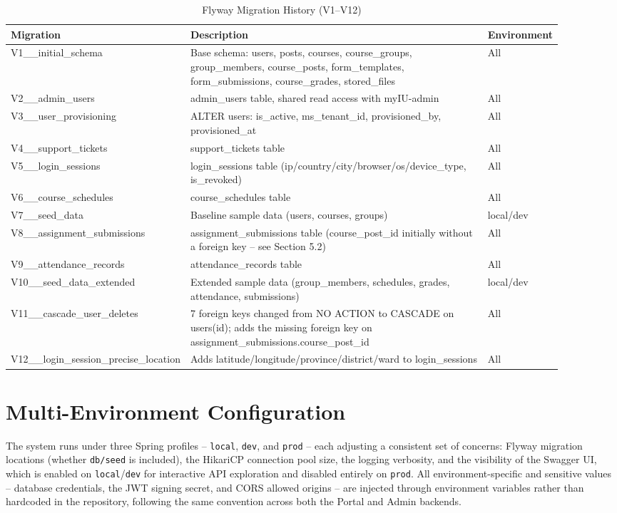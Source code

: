 \documentclass[12pt,a4paper]{report}
\begin{document}
\begin{longtable}{@{}p{0.20\linewidth}p{0.58\linewidth}p{0.12\linewidth}@{}}
\caption{Flyway Migration History (V1--V12)}
\label{tab:migrations}\\
\toprule
\textbf{Migration} & \textbf{Description} & \textbf{Environment} \\
\midrule
\endhead
V1\_\_initial\_schema & Base schema: users, posts, courses, course\_groups, group\_members, course\_posts, form\_templates, form\_submissions, course\_grades, stored\_files & All \\
V2\_\_admin\_users & admin\_users table, shared read access with myIU-admin & All \\
V3\_\_user\_provisioning & ALTER users: is\_active, ms\_tenant\_id, provisioned\_by, provisioned\_at & All \\
V4\_\_support\_tickets & support\_tickets table & All \\
V5\_\_login\_sessions & login\_sessions table (ip/country/city/browser/os/device\_type, is\_revoked) & All \\
V6\_\_course\_schedules & course\_schedules table & All \\
V7\_\_seed\_data & Baseline sample data (users, courses, groups) & local/dev \\
V8\_\_assignment\_submissions & assignment\_submissions table (course\_post\_id initially without a foreign key -- see Section 5.2) & All \\
V9\_\_attendance\_records & attendance\_records table & All \\
V10\_\_seed\_data\_extended & Extended sample data (group\_members, schedules, grades, attendance, submissions) & local/dev \\
V11\_\_cascade\_user\_deletes & 7 foreign keys changed from NO ACTION to CASCADE on users(id); adds the missing foreign key on assignment\_submissions.course\_post\_id & All \\
V12\_\_login\_session\_precise\_location & Adds latitude/longitude/province/district/ward to login\_sessions & All \\
\bottomrule
\end{longtable}

\section{Multi-Environment Configuration}

The system runs under three Spring profiles -- \texttt{local},
\texttt{dev}, and \texttt{prod} -- each adjusting a consistent set of
concerns: Flyway migration locations (whether \texttt{db/seed} is
included), the HikariCP connection pool size, the logging verbosity,
and the visibility of the Swagger UI, which is enabled on
\texttt{local}/\texttt{dev} for interactive API exploration and
disabled entirely on \texttt{prod}. All environment-specific and
sensitive values -- database credentials, the JWT signing secret, and
CORS allowed origins -- are injected through environment variables
rather than hardcoded in the repository, following the same convention
across both the Portal and Admin backends.
\end{document}
